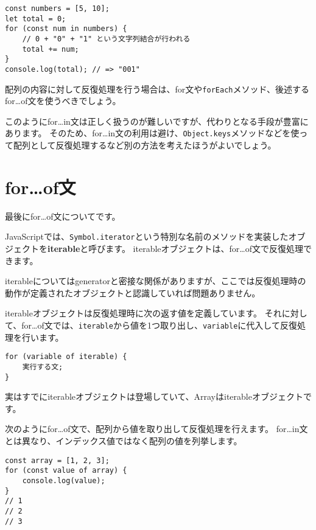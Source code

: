 \begin{lstlisting}
const numbers = [5, 10];
let total = 0;
for (const num in numbers) {
    // 0 + "0" + "1" という文字列結合が行われる
    total += num;
}
console.log(total); // => "001"
\end{lstlisting}

配列の内容に対して反復処理を行う場合は、for文や\texttt{forEach}メソッド、後述するfor\ldots{}of文を使うべきでしょう。

このようにfor\ldots{}in文は正しく扱うのが難しいですが、代わりとなる手段が豊富にあります。
そのため、for\ldots{}in文の利用は避け、\texttt{Object.keys}メソッドなどを使って配列として反復処理するなど別の方法を考えたほうがよいでしょう。

\hypertarget{for-of-statement}{%
\section[for\ldots{}of文]{for\ldots{}of文\,\protect{}}\label{for-of-statement}}

最後にfor\ldots{}of文についてです。

JavaScriptでは、\texttt{Symbol.iterator}という特別な名前のメソッドを実装したオブジェクトを\textbf{iterable}と呼びます。
iterableオブジェクトは、for\ldots{}of文で反復処理できます。

iterableについてはgeneratorと密接な関係がありますが、ここでは反復処理時の動作が定義されたオブジェクトと認識していれば問題ありません。

iterableオブジェクトは反復処理時に次の返す値を定義しています。
それに対して、for\ldots{}of文では、\texttt{iterable}から値を1つ取り出し、\texttt{variable}に代入して反復処理を行います。

\begin{lstlisting}
for (variable of iterable) {
    実行する文;
}
\end{lstlisting}

実はすでにiterableオブジェクトは登場していて、Arrayはiterableオブジェクトです。

次のようにfor\ldots{}of文で、配列から値を取り出して反復処理を行えます。
for\ldots{}in文とは異なり、インデックス値ではなく配列の値を列挙します。

\begin{lstlisting}
const array = [1, 2, 3];
for (const value of array) {
    console.log(value);
}
// 1
// 2
// 3
\end{lstlisting}

